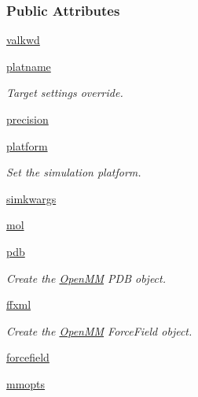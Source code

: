 \subsubsection*{Public Attributes}
\begin{DoxyCompactItemize}
\item 
\hyperlink{classforcebalance_1_1openmmio_1_1OpenMM_a13620e4a94ffad82abb1110426fcf4c4}{valkwd}
\item 
\hyperlink{classforcebalance_1_1openmmio_1_1OpenMM_ab5d0816c4dcde13ee327a744a20e423c}{platname}
\begin{DoxyCompactList}\small\item\em Target settings override. \end{DoxyCompactList}\item 
\hyperlink{classforcebalance_1_1openmmio_1_1OpenMM_acd9ff2413c156cb516f1cb1ffd122130}{precision}
\item 
\hyperlink{classforcebalance_1_1openmmio_1_1OpenMM_af878e4aa2a353e5de2dd14076de85766}{platform}
\begin{DoxyCompactList}\small\item\em Set the simulation platform. \end{DoxyCompactList}\item 
\hyperlink{classforcebalance_1_1openmmio_1_1OpenMM_a17a2d51b9fad73c6eb05d101bcef6ff0}{simkwargs}
\item 
\hyperlink{classforcebalance_1_1openmmio_1_1OpenMM_af2788f47d314baedd977d580fb57bd39}{mol}
\item 
\hyperlink{classforcebalance_1_1openmmio_1_1OpenMM_ad7968c9ed8ce2b911bb86f3a0181b3be}{pdb}
\begin{DoxyCompactList}\small\item\em Create the \hyperlink{classforcebalance_1_1openmmio_1_1OpenMM}{Open\-M\-M} P\-D\-B object. \end{DoxyCompactList}\item 
\hyperlink{classforcebalance_1_1openmmio_1_1OpenMM_a7b582832c72b1ab8639e5ce295fc3e83}{ffxml}
\begin{DoxyCompactList}\small\item\em Create the \hyperlink{classforcebalance_1_1openmmio_1_1OpenMM}{Open\-M\-M} Force\-Field object. \end{DoxyCompactList}\item 
\hyperlink{classforcebalance_1_1openmmio_1_1OpenMM_ab506379ae79c8dd5d3ee3e1686d48153}{forcefield}
\item 
\hyperlink{classforcebalance_1_1openmmio_1_1OpenMM_ac3e63ac13c418a2073685878a39e21f4}{mmopts}

\end{DoxyCompactItemize}
